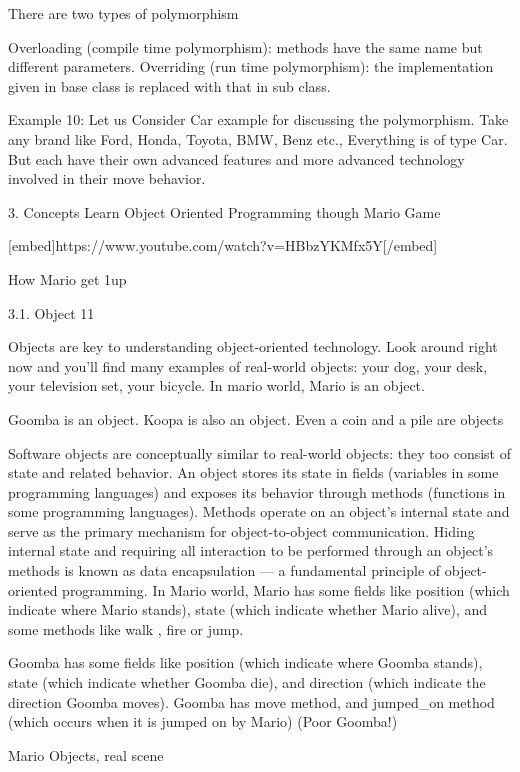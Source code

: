 There are two types of polymorphism



Overloading (compile time polymorphism): methods have the same name but different parameters.
Overriding (run time polymorphism): the implementation given in base class is replaced with that in sub class.


Example 10: Let us Consider Car example for discussing the polymorphism. Take any brand like Ford, Honda, Toyota, BMW, Benz etc., Everything is of type Car. But each have their own advanced features and more advanced technology involved in their move behavior.

3. Concepts
Learn Object Oriented Programming though Mario Game

[embed]https://www.youtube.com/watch?v=HBbzYKMfx5Y[/embed]

How Mario get 1up



3.1. Object 11

Objects are key to understanding object-oriented technology. Look around right now and you'll find many examples of real-world objects: your dog, your desk, your television set, your bicycle.
In mario world, Mario is an object.

  Goomba is an object.  Koopa is also an object. Even a coin and a pile  are objects

Software objects are conceptually similar to real-world objects: they too consist of state and related behavior. An object stores its state in fields (variables in some programming languages) and exposes its behavior through methods (functions in some programming languages). Methods operate on an object's internal state and serve as the primary mechanism for object-to-object communication. Hiding internal state and requiring all interaction to be performed through an object's methods is known as data encapsulation — a fundamental principle of object-oriented programming.
In Mario world, Mario  has some fields like position (which indicate where Mario stands), state (which indicate whether Mario alive), and some methods like walk , fire or jump.

Goomba  has some fields like position (which indicate where Goomba stands), state (which indicate whether Goomba die), and direction (which indicate the direction Goomba moves). Goomba has move method, and jumped_on method (which occurs when it is jumped on by Mario) (Poor Goomba!)

Mario Objects, real scene

